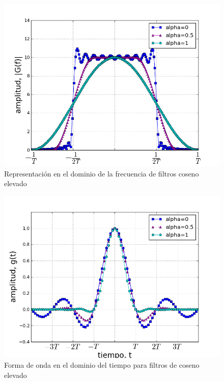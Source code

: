 \begin{figure}[htp]
  \centering
  \includegraphics[width=5.9in]{figs/rrcfreq}
  \vspace{0.3in}
  \caption{Representaci\'on en el dominio de la frecuencia de filtros coseno elevado}
  \label{fig:rrcfreq}
\end{figure}

\begin{figure}[htp]
  \centering
  \includegraphics[width=5.9in]{figs/rrctime}
  \vspace{0.3in}
  \caption{Forma de onda en el dominio del tiempo para filtros de coseno elevado}
  \label{fig:rrctime}
\end{figure}

